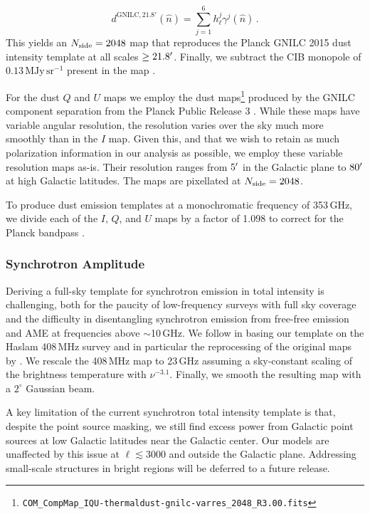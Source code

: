 \documentclass[twocolumn]{aastex631}
\begin{document}
 \begin{equation}
 d^{\text{GNILC,}\, 21.8'}(\hat{n})
=\sum_{j=1}^6 h^{j}_\ell \gamma^{j}(\hat{n})\,.
\label{eq:trucated_synthesis}
\end{equation}
This yields an $N_{\rm side} = 2048$ map that reproduces the Planck GNILC 2015 dust intensity template at all scales $\geq 21.8\mbox{$^\prime$}$. Finally, we subtract the CIB monopole of $0.13\, \text{MJy}\,\text{sr}^{-1}$ present in the map \citep[][Section~2.2]{planck2016-l11B}.

For the dust $Q$ and $U$ maps we employ the dust maps\footnote{\texttt{COM\_CompMap\_IQU-thermaldust-gnilc-varres\_2048\_R3.00.fits}} produced by the GNILC component separation from the Planck Public Release 3 \citep{planck2016-l04,planck2016-l11B}. While these maps have variable angular resolution, the resolution varies over the sky much more smoothly than in the $I$ map. Given this, and that we wish to retain as much polarization information in our analysis as possible, we employ these variable resolution maps as-is. Their resolution ranges from $5\mbox{$^\prime$}$ in the Galactic plane to $80\mbox{$^\prime$}$ at high Galactic latitudes. The maps are pixellated at $N_{\rm side} = 2048$. 

To produce dust emission templates at a monochromatic frequency of 353\,GHz, we divide each of the $I$, $Q$, and $U$ maps by a factor of 1.098 to correct for the Planck bandpass \citep[][Table~2]{planck2016-l11A}.

\subsubsection{Synchrotron Amplitude}
Deriving a full-sky template for synchrotron emission in total intensity is challenging, both for the paucity of low-frequency surveys with full sky coverage and the difficulty in disentangling synchrotron emission from free-free emission and AME at frequencies above $\sim$10\,GHz. We follow \citet{Thorne:2017} in basing our template on the Haslam 408\,MHz survey \citep{Haslam:1982} and in particular the reprocessing of the original maps by \citet{Remazeilles:2015}. We rescale the 408\,MHz map to 23\,GHz assuming a sky-constant scaling of the brightness temperature with $\nu^{-3.1}$. Finally, we smooth the resulting map with a $2^\circ$ Gaussian beam.

A key limitation of the current synchrotron total intensity template is that, despite the point source masking, we still find excess power from Galactic point sources at low Galactic latitudes near the Galactic center. Our models are unaffected by this issue at $\ell \lesssim 3000$ and outside the Galactic plane. Addressing small-scale structures in bright regions will be deferred to a future release.
\end{document}
